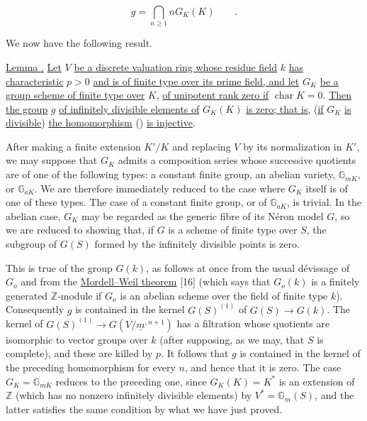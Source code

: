 \begin{equation*}
 g=\bigcap_{n\geq1}nG_K(K)\qquad .
\end{equation*}

We now have the following result.

\medskip
\noindent
\underline{Lemma .}  \underline{Let} $V$ \underline{be a
discrete valuation ring whose residue field} $k$ \underline{has
characteristic} $p>0$ \underline{and is of finite type over its prime
field, and let} $G_K$ \underline{be a group scheme of finite type over}
$K$, \underline{of unipotent rank zero if} $\operatorname{char}K=0$.
\underline{Then the group} $g$ \underline{of infinitely divisible
elements of} $G_K(K)$ \underline{is zero; that is,} (\underline{if}
$G_K$ \underline{is divisible}) \underline{the homomorphism} ()
\underline{is injective}.

After making a finite extension $K'/K$ and replacing $V$ by its
normalization in $K'$, we may suppose that $G_K$ admits a composition
series whose successive quotients are of one of the following types:
a constant finite group, an abelian variety, $\mathbb G_{mK}$, or
$\mathbb G_{aK}$.  We are therefore immediately reduced to the case
where $G_K$ itself is of one of these types.  The case of a constant
finite group, or of $\mathbb G_{aK}$, is trivial.  In the abelian case,
$G_K$ may be regarded as the generic fibre of its N\'{e}ron model $G$,
so we are reduced to showing that, if $G$ is a scheme of finite type
over $S$, the subgroup of $G(S)$ formed by the infinitely divisible
points is zero.

This is true of the group $G(k)$, as follows at once from the usual
d\'{e}vissage of $G_o$ and from the \underline{Mordell--Weil theorem}
[16] (which says that $G_o(k)$ is a finitely generated $\mathbb Z$-module
if $G_o$ is an abelian scheme over the field of finite type $k$).
Consequently $g$ is contained in the kernel $G(S)^{(1)}$ of
$G(S)\longrightarrow G(k)$.  The kernel of
$G(S)^{(1)}\longrightarrow G(V/\underline m^{,n+1})$ has a filtration
whose quotients are isomorphic to vector groups over $k$ (after
supposing, as we may, that $S$ is complete), and these are killed by
$p$.  It follows that $g$ is contained in the kernel of the preceding
homomorphism for every $n$, and hence that it is zero.  The case
$G_K=\mathbb G_{mK}$ reduces to the preceding one, since
$G_K(K)=K^*$ is an extension of $\mathbb Z$ (which has no nonzero
infinitely divisible elements) by
$V^*=\mathbb G_m(S)$, and the latter satisfies the same condition by
what we have just proved.

